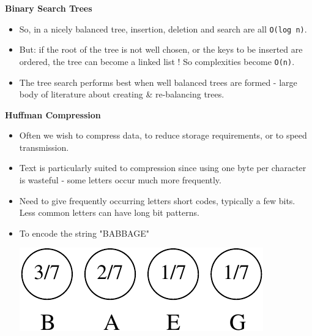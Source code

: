 \newpage	
{\samepage	
\begin{center}	
{\Large{\bf Binary Search Trees}}	
\end{center}	
\begin{itemize}	
\item So, in a nicely balanced tree, insertion, deletion and search are all \verb^O(log n)^.
\item  But: if the root of the tree is not well chosen, or the keys to be inserted are ordered, the tree can become a linked list ! So complexities become \verb^O(n)^.	
\item The tree search performs best when well balanced trees are formed - large	
body of literature about creating \& re-balancing trees.	
\end{itemize}	
}	






\newpage	
{\samepage	
\begin{center}	
{\Large{\bf Huffman Compression}}	
\end{center}	
\begin{itemize}	
\item Often we wish to compress data, to reduce storage requirements, or to speed transmission.	
\item  Text is particularly suited to compression since using one byte per character is wasteful - some letters occur much more frequently.	
\item  Need to give frequently occurring letters short codes, typically a few bits. Less common letters can have long bit patterns.	
\item To encode the string "BABBAGE"	
\begin{center}	
\includegraphics{../Images/huff1.pdf}	
\end{center}	
\end{itemize}	
}	

